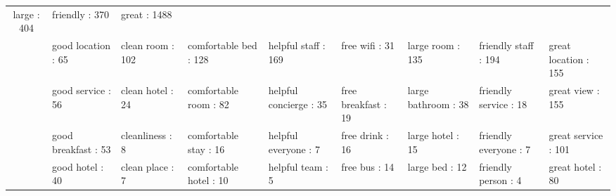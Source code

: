 \documentclass[smallextended,natbib]{svjour3}       %
\begin{document}
\begin{landscape}
\begin{table}[p]
{\begin{tabular}{|c|l|l|l|l|l|l|l|l|}
          large : 404 &
          friendly : 370 &
          great : 1488 \\
         &
          good location : 65 &
          clean room : 102 &
          comfortable bed : 128 &
          helpful staff : 169 &
          free wifi : 31 &
          large room : 135 &
          friendly staff : 194 &
          great location : 155 \\
         &
          good service : 56 &
          clean hotel : 24 &
          comfortable room : 82 &
          helpful concierge : 35 &
          free breakfast : 19 &
          large bathroom : 38 &
          friendly service : 18 &
          great view : 155 \\
         &
          good breakfast : 53 &
          cleanliness : 8 &
          comfortable stay : 16 &
          helpful everyone : 7 &
          free drink : 16 &
          large hotel : 15 &
          friendly everyone : 7 &
          great service : 101 \\
         &
          good hotel : 40 &
          clean place : 7 &
          comfortable hotel : 10 &
          helpful team : 5 &
          free bus : 14 &
          large bed : 12 &
          friendly person : 4 &
          great hotel : 80 \\ \hline
        \end{tabular}%
        }
    \end{table}
    \end{landscape}
\end{document}
